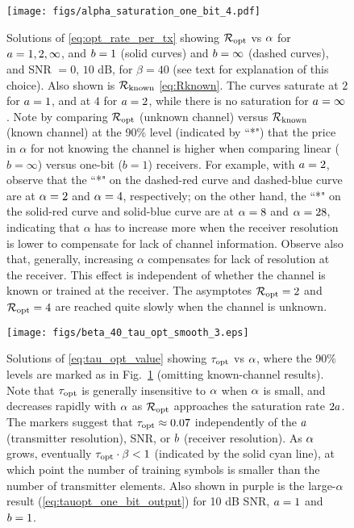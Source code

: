 \documentclass[12pt, draftclsnofoot,journal,onecolumn]{IEEEtran}
\begin{document}
\begin{figure}
\texttt{[image: figs/alpha\_saturation\_one\_bit\_4.pdf]}
\centering
    \caption{Solutions of \eqref{eq:opt_rate_per_tx} showing $\mathcal{R}_{\rm opt}$ vs $\alpha$ for $a=1,2,\infty$, and $b=1$ (solid curves) and $b=\infty$ (dashed curves), and SNR $=0,\,10$ dB, for $\beta=40$ (see text for explanation of this choice).  Also shown is $\mathcal{R}_{\rm known}$ \eqref{eq:Rknown}.  The curves saturate at $2$ for $a=1$, and at $4$ for $a=2$, while there is no saturation for $a=\infty$.    Note by comparing $\mathcal{R}_{\rm opt}$ (unknown channel) versus $\mathcal{R}_{\rm known}$ (known channel) at the 90\% level (indicated by ``*") that the price in $\alpha$ for not knowing the channel is higher when comparing linear ($b=\infty$) versus one-bit ($b=1$) receivers.  For example, with $a=2$, observe that the ``*" on the dashed-red curve and dashed-blue curve are at $\alpha=2$ and $\alpha=4$, respectively; on the other hand, the ``*" on the solid-red curve and solid-blue curve are at $\alpha=8$ and $\alpha=28$, indicating that $\alpha$ has to increase more when the receiver resolution is lower to compensate for lack of channel information.
    Observe also that, generally, increasing $\alpha$ compensates for lack of resolution at the receiver.  
    This effect is independent of whether the channel is known or trained at the receiver.  The asymptotes $\mathcal{R}_{\rm opt}=2$ and $\mathcal{R}_{\rm opt}=4$ are reached quite slowly when the channel is unknown.}
    \label{fig:alpha_saturation_one_bit}
\end{figure}

\begin{figure}
\texttt{[image: figs/beta\_40\_tau\_opt\_smooth\_3.eps]}
\centering
    \caption{Solutions of \eqref{eq:tau_opt_value} showing $\tau_{{\rm opt}}$ vs $\alpha$, where the 90\% levels are marked as in Fig.\ \ref{fig:alpha_saturation_one_bit} (omitting known-channel results). Note that $\tau_{{\rm opt}}$ is generally insensitive to $\alpha$ when $\alpha$ is small, and decreases rapidly with $\alpha$ as $\mathcal{R}_{\rm opt}$ approaches the saturation rate $2a$.  The markers suggest that $\tau_{{\rm opt}}\approx 0.07$ independently of the $a$ (transmitter resolution), SNR, or $b$ (receiver resolution).  As $\alpha$ grows, eventually $\tau_{{\rm opt}}\cdot\beta<1$ (indicated by the solid cyan line), at which point the number of training symbols is smaller than the number of transmitter elements.  Also shown in purple is the large-$\alpha$ result (\ref{eq:tauopt_one_bit_output}) for 10 dB SNR, $a=1$ and $b=1$.}
    \label{fig:beta_40_tau_opt_smooth}
\end{figure}
\end{document}
